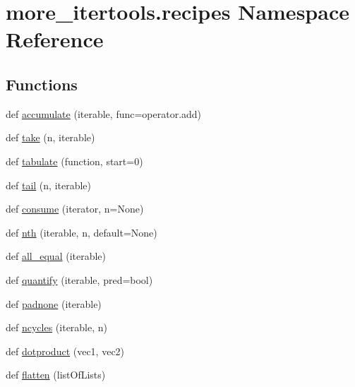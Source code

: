 \hypertarget{namespacemore__itertools_1_1recipes}{}\section{more\+\_\+itertools.\+recipes Namespace Reference}
\label{namespacemore__itertools_1_1recipes}
\subsection*{Functions}
\begin{DoxyCompactItemize}
\item 
def \hyperlink{namespacemore__itertools_1_1recipes_a652beac76dcf8f1184efc52a82baf6a5}{accumulate} (iterable, func=operator.\+add)
\item 
def \hyperlink{namespacemore__itertools_1_1recipes_a98a7fa4325188c4f21ec27bdca3209c0}{take} (n, iterable)
\item 
def \hyperlink{namespacemore__itertools_1_1recipes_ab26d4a14071109df8e8b32a01cc529bd}{tabulate} (function, start=0)
\item 
def \hyperlink{namespacemore__itertools_1_1recipes_a6a78aabd5136eaa8ee9f020d0e743ee8}{tail} (n, iterable)
\item 
def \hyperlink{namespacemore__itertools_1_1recipes_ac9f06068415d848706d2610a7a5cfb1d}{consume} (iterator, n=None)
\item 
def \hyperlink{namespacemore__itertools_1_1recipes_a436b5ed8f5e2d2a013defa73efe58e96}{nth} (iterable, n, default=None)
\item 
def \hyperlink{namespacemore__itertools_1_1recipes_a6400a87494f1598bf44f25baba0aff89}{all\+\_\+equal} (iterable)
\item 
def \hyperlink{namespacemore__itertools_1_1recipes_a6be608968636cbc9c86ae22dfafa2084}{quantify} (iterable, pred=bool)
\item 
def \hyperlink{namespacemore__itertools_1_1recipes_ac5597d78009d99f7e689816d319a9a19}{padnone} (iterable)
\item 
def \hyperlink{namespacemore__itertools_1_1recipes_ab7e0f302ed571cc4d184ab2d8681c3fa}{ncycles} (iterable, n)
\item 
def \hyperlink{namespacemore__itertools_1_1recipes_af69e810bf23869a13ece58c041a621e7}{dotproduct} (vec1, vec2)
\item 
def \hyperlink{namespacemore__itertools_1_1recipes_a7b1ecd9c57f8f84daf1b7ba33054daef}{flatten} (list\+Of\+Lists)
\item 

\end{DoxyCompactItemize}
